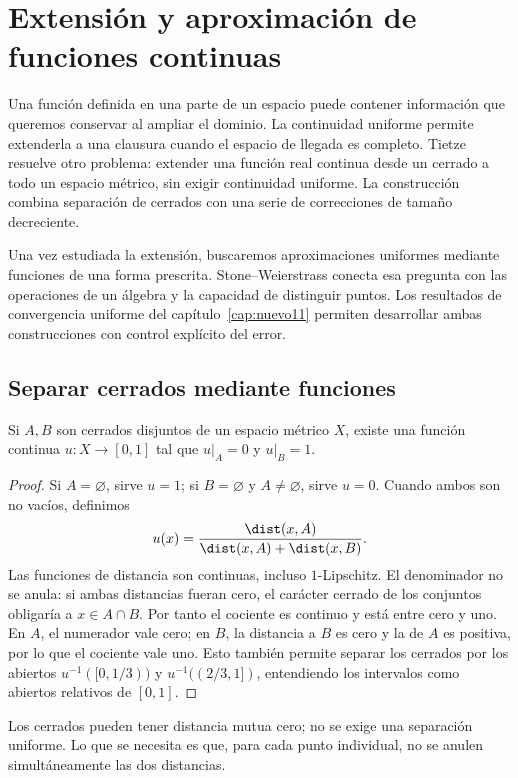 \chapter{Extensión y aproximación de funciones continuas}\label{cap:nuevo13}\label{chap:12}\label{chap:28}

Una función definida en una parte de un espacio puede contener información que queremos conservar al ampliar el dominio. La continuidad uniforme permite extenderla a una clausura cuando el espacio de llegada es completo. Tietze resuelve otro problema: extender una función real continua desde un cerrado a todo un espacio métrico, sin exigir continuidad uniforme. La construcción combina separación de cerrados con una serie de correcciones de tamaño decreciente.

Una vez estudiada la extensión, buscaremos aproximaciones uniformes mediante funciones de una forma prescrita. Stone--Weierstrass conecta esa pregunta con las operaciones de un álgebra y la capacidad de distinguir puntos. Los resultados de convergencia uniforme del capítulo~\ref{cap:nuevo11} permiten desarrollar ambas construcciones con control explícito del error.

\section{Separar cerrados mediante funciones}
\label{lectura:12}
\begin{teorema}\label{ch12:urysohn}
Si $A,B$ son cerrados disjuntos de un espacio métrico $X$, existe una función continua $u:X\to[0,1]$ tal que $u|_A=0$ y $u|_B=1$.
\end{teorema}
\begin{proof}
Si $A=\varnothing$, sirve $u=1$; si $B=\varnothing$ y $A\ne\varnothing$, sirve $u=0$. Cuando ambos son no vacíos, definimos
\[
 u(x)=\frac{\dist(x,A)}{\dist(x,A)+\dist(x,B)}.
\]
Las funciones de distancia son continuas, incluso $1$-Lipschitz. El denominador no se anula: si ambas distancias fueran cero, el carácter cerrado de los conjuntos obligaría a $x\in A\cap B$. Por tanto el cociente es continuo y está entre cero y uno. En $A$, el numerador vale cero; en $B$, la distancia a $B$ es cero y la de $A$ es positiva, por lo que el cociente vale uno. Esto también permite separar los cerrados por los abiertos $u^{-1}([0,1/3))$ y $u^{-1}((2/3,1])$, entendiendo los intervalos como abiertos relativos de $[0,1]$.
\end{proof}
Los cerrados pueden tener distancia mutua cero; no se exige una separación uniforme. Lo que se necesita es que, para cada punto individual, no se anulen simultáneamente las dos distancias.

